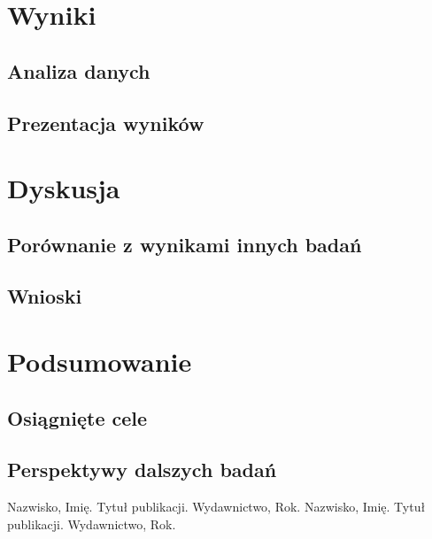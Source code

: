 \documentclass{report}
\begin{document}
	\chapter{Wyniki}
	\section{Analiza danych}
	\section{Prezentacja wyników}

	\chapter{Dyskusja}
	\section{Porównanie z wynikami innych badań}
	\section{Wnioski}

	\chapter{Podsumowanie}
	\section{Osiągnięte cele}
		\section{Perspektywy dalszych badań}






	\begin{thebibliography}{99}
		 Nazwisko, Imię. Tytuł publikacji. Wydawnictwo, Rok.
		 Nazwisko, Imię. Tytuł publikacji. Wydawnictwo, Rok.
	\end{thebibliography}
\end{document}
